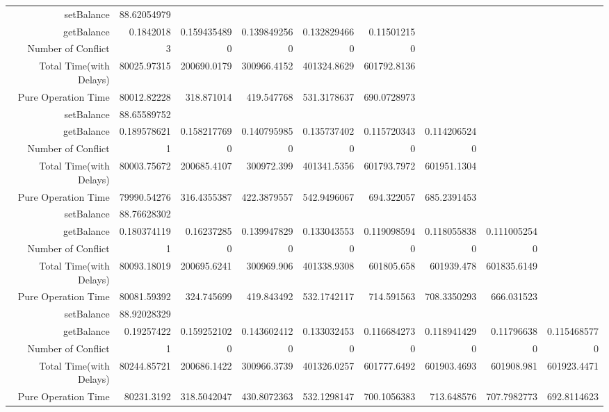 \begin{landscape}
\begin{table}[htbp]
\begin{tabular}{rrrrrrrrr}
    \cline{1-9}
    setBalance & 88.62054979 &       &       &       &       &       &       &  \\
    getBalance & 0.1842018 & 0.159435489 & 0.139849256 & 0.132829466 & 0.11501215 &       &       &  \\
    Number of Conflict & 3     & 0     & 0     & 0     & 0     &       &       &  \\
    Total Time(with Delays) & 80025.97315 & 200690.0179 & 300966.4152 & 401324.8629 & 601792.8136 &       &       &  \\
    Pure Operation Time & 80012.82228 & 318.871014 & 419.547768 & 531.3178637 & 690.0728973 &       &       &  \\
\cline{1-9}    
    setBalance & 88.65589752 &       &       &       &       &       &       &  \\
    getBalance & 0.189578621 & 0.158217769 & 0.140795985 & 0.135737402 & 0.115720343 & 0.114206524 &       &  \\
    Number of Conflict & 1     & 0     & 0     & 0     & 0     & 0     &       &  \\
    Total Time(with Delays) & 80003.75672 & 200685.4107 & 300972.399 & 401341.5356 & 601793.7972 & 601951.1304 &       &  \\
    Pure Operation Time & 79990.54276 & 316.4355387 & 422.3879557 & 542.9496067 & 694.322057 & 685.2391453 &       &  \\
\cline{1-9}    
    setBalance & 88.76628302 &       &       &       &       &       &       &  \\
    getBalance & 0.180374119 & 0.16237285 & 0.139947829 & 0.133043553 & 0.119098594 & 0.118055838 & 0.111005254 &  \\
    Number of Conflict & 1     & 0     & 0     & 0     & 0     & 0     & 0     &  \\
    Total Time(with Delays) & 80093.18019 & 200695.6241 & 300969.906 & 401338.9308 & 601805.658 & 601939.478 & 601835.6149 &  \\
    Pure Operation Time & 80081.59392 & 324.745699 & 419.843492 & 532.1742117 & 714.591563 & 708.3350293 & 666.031523 &  \\
\cline{1-9}    
    setBalance & 88.92028329 &       &       &       &       &       &       &  \\
    getBalance & 0.19257422 & 0.159252102 & 0.143602412 & 0.133032453 & 0.116684273 & 0.118941429 & 0.11796638 & 0.115468577 \\
    Number of Conflict & 1     & 0     & 0     & 0     & 0     & 0     & 0     & 0 \\
    Total Time(with Delays) & 80244.85721 & 200686.1422 & 300966.3739 & 401326.0257 & 601777.6492 & 601903.4693 & 601908.981 & 601923.4471 \\
    Pure Operation Time & 80231.3192 & 318.5042047 & 430.8072363 & 532.1298147 & 700.1056383 & 713.648576 & 707.7982773 & 692.8114623 \\
    \bottomrule
    \end{tabular}%
  \label{tab:increments & reads Cache}%
\end{table}%
\end{landscape}

